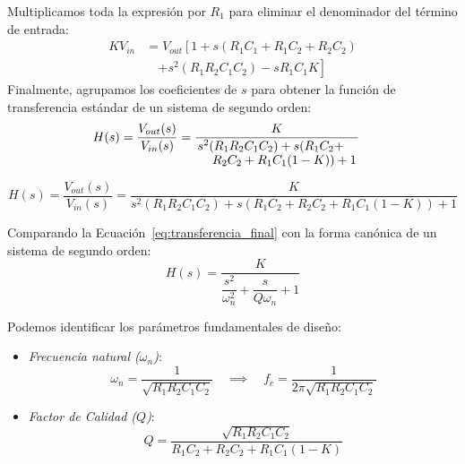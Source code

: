 {%
Multiplicamos toda la expresión por $R_1$ para eliminar el denominador del término de entrada:
\begin{equation*}
    \begin{split}
    K V_{in} &= V_{out} \left[ 1 + s \left( R_1 C_1 + R_1 C_2 + R_2 C_2 \right) \right. \\
    &\quad \left. + s^2 (R_1 R_2 C_1 C_2) - s R_1 C_1 K \right]
    \end{split}
\end{equation*}
Finalmente, agrupamos los coeficientes de $s$ para obtener la función de transferencia estándar de un sistema de segundo orden:
\begin{align*}
H(s) &= \frac{V_{out}(s)}{V_{in}(s)} = \frac{K}{\splitfrac{s^2(R_1 R_2 C_1 C_2) + s(R_1 C_2 +}{R_2 C_2 + R_1 C_1 (1 - K)) + 1}}
\end{align*}
}

\begin{equation}\label{eq:transferencia_final}
    H(s) = \frac{V_{out}(s)}{V_{in}(s)} = \frac{K}{s^2(R_1R_2C_1C_2) + s(R_1C_2 + R_2C_2 + R_1C_1(1-K)) + 1}
\end{equation}

Comparando la Ecuación~\ref{eq:transferencia_final} con la forma canónica de un sistema de segundo orden:
\begin{equation}\label{eq:tf_canonica}
    H(s) = \dfrac{K}{\dfrac{s^2}{\omega_n^2} + \dfrac{s}{Q\omega_n} + 1}
\end{equation}

Podemos identificar los parámetros fundamentales de diseño:
\begin{itemize}
    \item \emph{Frecuencia natural ($\omega_n$)}: 
    \[ \omega_n = \frac{1}{\sqrt{R_1R_2C_1C_2}} \quad \implies \quad f_c = \frac{1}{2\pi \sqrt{R_1R_2C_1C_2}} \]
    \item \emph{Factor de Calidad ($Q$)}:
    \[ Q = \frac{\sqrt{R_1R_2C_1C_2}}{R_1C_2 + R_2C_2 + R_1C_1(1-K)} \]
\end{itemize}


